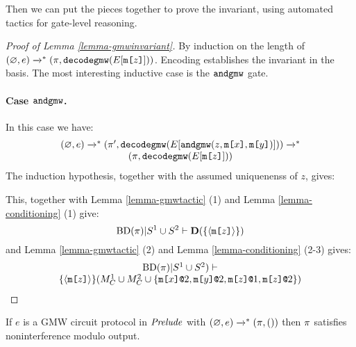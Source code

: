 Then we can put the pieces together to prove the invariant, using automated tactics
for gate-level reasoning.  
\begin{proof}[Proof of Lemma \ref{lemma-gmwinvariant}]
  By induction on the length of $(\varnothing,e) \redxs (\prog,\decodegmw(E[\mesg{z}]))$.
  Encoding establishes the invariant in the basis. The most interesting inductive
  case is the $\andgmw$ gate. 
  \paragraph{Case $\andgmw$.} In this case we have:
  $$
  \begin{array}{c}
  (\varnothing,e) \redxs (\prog',\decodegmw(E[\andgmw(z,\mesg{x},\mesg{y})])) \redxs \\
    (\prog,\decodegmw(E[\mesg{z}]))
  \end{array}
  $$
  The induction hypothesis, together with the assumed uniquenenss of $z$, gives:
  \begin{mathpar}
  

  
  \end{mathpar}
  This, together with Lemma \ref{lemma-gmwtactic} (1) and Lemma \ref{lemma-conditioning} (1)
  give:
  $$
  \conddetx{\progtt(\prog)}{S^1 \cup S^2}{\{ \macgv{\mesg{z}} \}}
  $$
  and Lemma  \ref{lemma-gmwtactic} (2) and Lemma \ref{lemma-conditioning} (2-3) gives:
  $$
  \begin{array}{c}
    \progtt(\prog)|S^1 \cup S^2) \vdash \\
    {\{ \macgv{\mesg{z}} \}}{(M^1_C \cup M^2_C \cup \{ \elab{\mesg{x}}{2}, \elab{\mesg{y}}{2}, \elab{\mesg{z}}{1}, \elab{\mesg{z}}{2} \})}
  \end{array}
  $$
\end{proof}

\begin{theorem}
  If $e$ is a GMW circuit protocol in $\metaprot$ with $(\varnothing,e) \redxs (\prog,())$
  then $\prog$ satisfies noninterference modulo output. 
\end{theorem}

